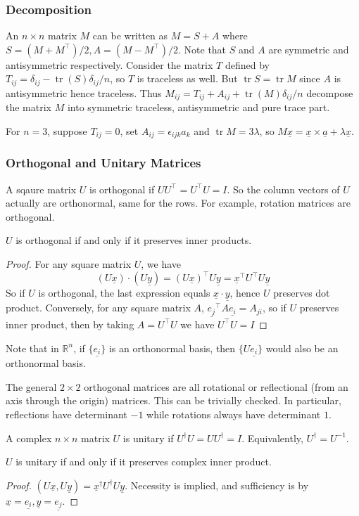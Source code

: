 \subsubsection{Decomposition}
An $n\times n$ matrix $M$ can be written as $M=S+A$ where $S=(M+M^\top)/2,A=(M-M^\top)/2$.
Note that $S$ and $A$ are symmetric and antisymmetric respectively.
Consider the matrix $T$ defined by $T_{ij}=\delta_{ij}-\operatorname{tr}(S)\delta_{ij}/n$, so $T$ is traceless as well.
But $\operatorname{tr}S=\operatorname{tr}M$ since $A$ is antisymmetric hence traceless.
Thus $M_{ij}=T_{ij}+A_{ij}+\operatorname{tr}(M)\delta_{ij}/n$ decompose the matrix $M$ into symmetric traceless, antisymmetric and pure trace part.
\begin{example}
    For $n=3$, suppose $T_{ij}=0$, set $A_{ij}=\epsilon_{ijk}a_k$ and $\operatorname{tr}M=3\lambda$, so $M\underline{x}=\underline{x}\times\underline{a}+\lambda\underline{x}$.
\end{example}
\subsubsection{Orthogonal and Unitary Matrices}
A sqaure matrix $U$ is orthogonal if $UU^\top=U^\top U=I$.
So the column vectors of $U$ actually are orthonormal, same for the rows.
For example, rotation matrices are orthogonal.
\begin{proposition}
    $U$ is orthogonal if and only if it preserves inner products.
\end{proposition}
\begin{proof}
    For any square matrix $U$, we have
    $$(U\underline{x})\cdot(U\underline{y})=(U\underline{x})^\top U\underline{y}=\underline{x}^\top U^\top U\underline{y}$$
    So if $U$ is orthogonal, the last expression equals $\underline{x}\cdot\underline{y}$, hence $U$ preserves dot product.
    Conversely, for any square matrix $A$, $\underline{e_j}^\top A\underline{e_i}=A_{ji}$, so if $U$ preserves inner product, then by taking $A=U^\top U$ we have $U^\top U=I$
\end{proof}
Note that in $\mathbb R^n$, if $\{\underline{e_i}\}$ is an orthonormal basis, then $\{U\underline{e_i}\}$ would also be an orthonormal basis.
\begin{example}
    The general $2\times 2$ orthogonal matrices are all rotational or reflectional (from an axis through the origin) matrices.
    This can be trivially checked.
    In particular, reflections have determinant $-1$ while rotations always have determinant $1$.
\end{example}
\begin{definition}
    A complex $n\times n$ matrix $U$ is unitary if $U^\dagger U=UU^\dagger=I$.
    Equivalently, $U^\dagger=U^{-1}$.
\end{definition}
\begin{proposition}
    $U$ is unitary if and only if it preserves complex inner product.
\end{proposition}
\begin{proof}
    $(U\underline{x},U\underline{y})=\underline{x}^\dagger U^\dagger U\underline{y}$.
    Necessity is implied, and sufficiency is by $\underline{x}=\underline{e_i},\underline{y}=\underline{e_j}$.
\end{proof}
